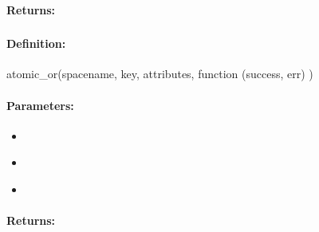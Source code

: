 \paragraph{Returns:}


\pagebreak
\subsubsection{}
\label{api:nodejs:atomic_or}


\paragraph{Definition:}
\begin{javascriptcode}
atomic_or(spacename, key, attributes, function (success, err) {})
\end{javascriptcode}
\paragraph{Parameters:}
\begin{itemize}[noitemsep]
\item {}\\

\item {}\\

\item {}\\

\end{itemize}

\paragraph{Returns:}


\pagebreak
\subsubsection{}
\label{api:nodejs:cond_atomic_or}


